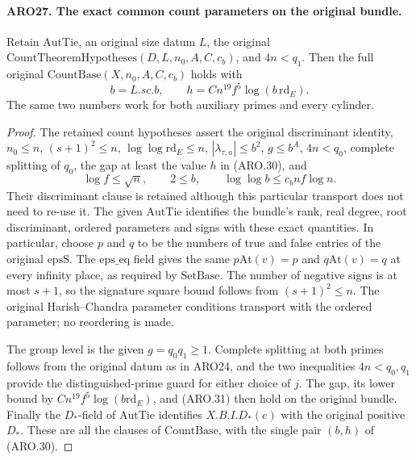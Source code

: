 \paragraph{ARO27. The exact common count parameters on the original bundle.}
\label{claim:ARO27}
Retain \(\mathrm{AutTie}\), an original size datum \(L\), the
original \(\mathrm{CountTheoremHypotheses}(D,L,n_0,A,C,c_b)\),
and \(4n<q_1\).  Then the full original
\(\mathrm{CountBase}(X,n_0,A,C,c_b)\) holds with
\[
 b=L.sc.b,\qquad h=Cn^{19}f^5\log(b\,\mathrm{rd}_E).
 \tag{ARO.30}
\]
The same two numbers work for both auxiliary primes and every
cylinder.
\begin{proof}
The retained count hypotheses assert the original discriminant
identity, \(n_0\leq n\), \((s+1)^2\leq n\),
\(\log\log\mathrm{rd}_E\leq n\),
\(|\lambda_{\tau,a}|\leq b^2\), \(g\leq b^A\),
\(4n<q_0\), complete splitting of \(q_0\), the gap at least
the value \(h\) in (ARO.30), and
\[
 \log f\leq\sqrt n,\qquad 2\leq b,\qquad
              \log\log b\leq c_bnf\log n.            \tag{ARO.31}
\]
Their discriminant clause is retained although this particular
transport does not need to re-use it.  The given \(\mathrm{AutTie}\)
identifies the bundle's rank, real degree, root discriminant,
ordered parameters and signs with these exact quantities.  In
particular, choose \(p\) and \(q\) to be the numbers of true and
false entries of the original \(\mathrm{epsS}\).  The
\(\mathrm{eps\_eq}\) field gives the same
\(p\mathrm{At}(v)=p\) and \(q\mathrm{At}(v)=q\) at every
infinity place, as required by \(\mathrm{SetBase}\).  The
number of negative signs is at most \(s+1\), so the signature
square bound follows from \((s+1)^2\leq n\).  The original
Harish--Chandra parameter conditions transport with the ordered
parameter; no reordering is made.

The group level is the given \(g=q_0q_1\geq1\).  Complete
splitting at both primes follows from the original datum as in
ARO24, and the two inequalities \(4n<q_0,q_1\) provide the
distinguished-prime guard for either choice of \(j\).
The gap, its lower bound by \(Cn^{19}f^5\log(b\mathrm{rd}_E)\),
and (ARO.31) then hold on the original bundle.  Finally the
\(D_*\)-field of \(\mathrm{AutTie}\) identifies
\(X.B.I.D_*(e)\) with the original positive \(D_*\).
These are all the clauses of \(\mathrm{CountBase}\), with the
single pair \((b,h)\) of (ARO.30).
\end{proof}

